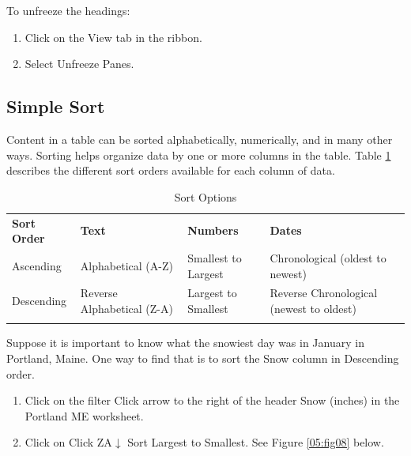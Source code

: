 To unfreeze the headings:

\begin{enumerate}
	\item Click on the View tab in the ribbon.
	\item Select Unfreeze Panes.
\end{enumerate}

\subsection{Simple Sort}

Content in a table can be sorted alphabetically, numerically, and in many other ways. Sorting helps organize data by one or more columns in the table. Table \ref{05:tab04} describes the different sort orders available for each column of data.

{\small
	\begin{longtable}{p{0.75in}p{1.0in}p{0.65in}p{0.85in}} %
		\textbf{Sort Order} & \textbf{Text} & \textbf{Numbers} & \textbf{Dates} \endhead
		\hline \\
		Ascending & Alphabetical (A-Z) & Smallest to Largest & Chronological (oldest to newest)\\
		Descending & Reverse Alphabetical (Z-A) & Largest to Smallest & Reverse Chronological (newest to oldest)\\
		\caption{Sort Options}
		\label{05:tab04}
	\end{longtable}
}

Suppose it is important to know what the snowiest day was in January in Portland, Maine. One way to find that is to sort the Snow column in Descending order.

\begin{enumerate}
	\item Click on the filter Click arrow to the right of the header Snow (inches) in the Portland ME worksheet.
	\item Click on Click ZA$ \downarrow $ Sort Largest to Smallest. See Figure \ref{05:fig08} below.
\end{enumerate}

